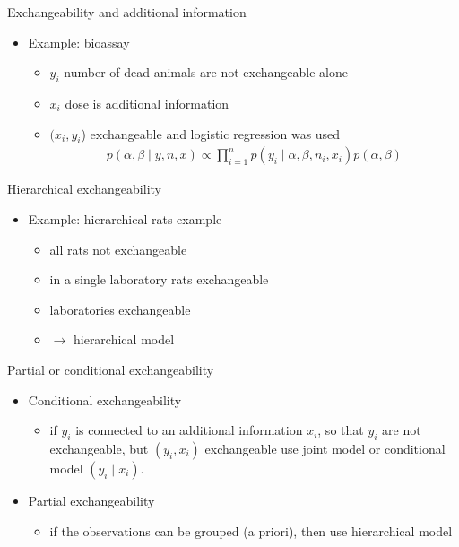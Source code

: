 \documentclass[finnish,english,t]{beamer}
\begin{document}
\begin{frame}{Exchangeability and additional information}

  \begin{itemize}
  \item Example: bioassay
    \begin{itemize}
      \item<+-> $y_i$ number of dead animals are not exchangeable alone
      \item<+-> $x_i$ dose is additional information
      \item<+-> $(x_i,y_i$) exchangeable and logistic regression was used
    \begin{align*}
      p(\alpha,\beta \mid y,n,x)\propto \prod_{i=1}^n p(y_i \mid \alpha,\beta,n_i,x_i)p(\alpha,\beta)
    \end{align*}
    \end{itemize}
  \end{itemize}
\end{frame}

\begin{frame}{Hierarchical exchangeability}

  \begin{itemize}
  \item Example: hierarchical rats example
    \begin{itemize}
    \item<+-> all rats not exchangeable
    \item<+-> in a single laboratory rats exchangeable
    \item<+-> laboratories exchangeable
    \item<+-> $\rightarrow$ hierarchical model
    \end{itemize}
  \end{itemize}
\end{frame}

\begin{frame}
  
  {\Large\color{navyblue} Partial or conditional exchangeability}

\begin{itemize}
  \item Conditional exchangeability
    \begin{itemize}
    \item if $y_i$ is connected to an additional information $x_i$, so
      that $y_i$ are not exchangeable, but $(y_i,x_i)$ exchangeable
      use joint model or conditional model $(y_i \mid x_i)$.
    \end{itemize}
  \item<2-> Partial exchangeability
    \begin{itemize}
    \item if the observations can be grouped (a priori), then use
      hierarchical model
    \end{itemize}
\end{itemize}
\end{frame}
\end{document}
